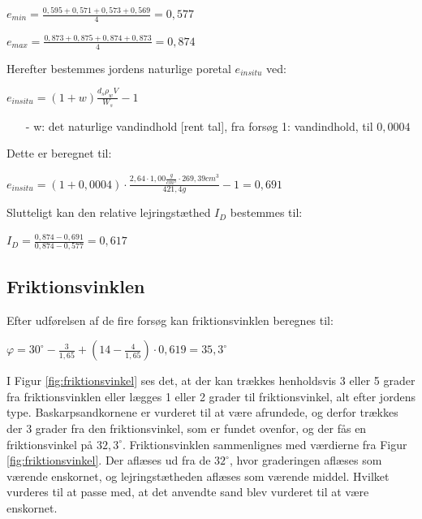 \begin{center}
	$e_{min} = \frac{0,\!595 + 0,\!571 + 0,\!573 + 0,\!569}{4} = 0,\!577$
\end{center}

\begin{center}
	$e_{max} = \frac{0,\!873 + 0,\!875 + 0,\!874 + 0,\!873}{4} = 0,\!874$
\end{center}

Herefter bestemmes jordens naturlige poretal $e_{in situ}$ ved:

\begin{center}
	$e_{in situ} = (1 + w) \frac{d_s  \rho_w  V}{W_s} - 1$
\end{center}

\begin{itemize}
	\item[-] w: det naturlige vandindhold [rent tal], fra forsøg 1: vandindhold, til $0,\!0004$ 
\end{itemize}

Dette er beregnet til:

\begin{center}
	$e_{in situ} = (1+0,\!0004) \cdot \frac{2,\!64 \cdot 1,\!00 \frac{g}{cm^3} \cdot 269,\!39 cm^3}{421,\!4 g} - 1 = 0,\!691$
\end{center}

Slutteligt kan den relative lejringstæthed $I_D$ bestemmes til:

\begin{center}
	$I_D = \frac{0,\!874 - 0,\!691}{0,\!874 - 0,\!577} = 0,\!617$
\end{center}

\subsection{Friktionsvinklen}
Efter udførelsen af de fire forsøg kan friktionsvinklen beregnes til:

\begin{center}
	$\varphi = 30^\circ - \frac{3}{1,\!65} + (14 - \frac{4}{1,\!65}) \cdot 0,\!619 = 35,\!3^\circ$
\end{center}

I Figur \ref{fig:friktionsvinkel} ses det, at der kan trækkes henholdsvis 3 eller 5 grader fra friktionsvinklen eller lægges 1 eller 2 grader til friktionsvinkel, alt efter jordens type. Baskarpsandkornene er vurderet til at være afrundede, og derfor trækkes der 3 grader fra den friktionsvinkel, som er fundet ovenfor, og der fås en friktionsvinkel på $32,\!3^\circ$. 
\newline
\newline
Friktionsvinklen sammenlignes med værdierne fra Figur \ref{fig:friktionsvinkel}. Der aflæses ud fra de $32^{\circ}$, hvor graderingen aflæses som værende enskornet, og lejringstætheden aflæses som værende middel. Hvilket vurderes til at passe med, at det anvendte sand blev vurderet til at være enskornet.


